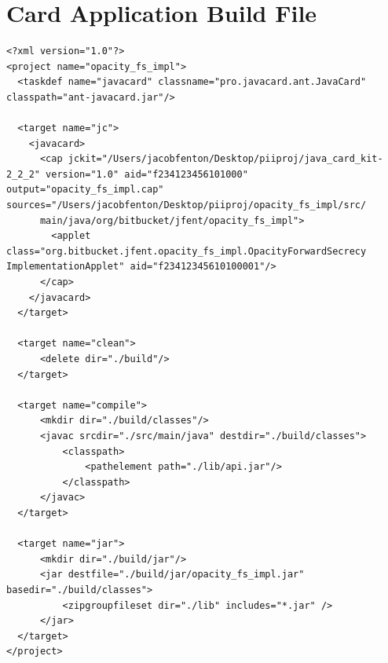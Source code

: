 \documentclass[12pt,a4paper,twoside,openright]{report}
\begin{document}


\chapter{Card Application Build File}
\label{appendix:cardappbuildfile}

\begin{verbatim}
<?xml version="1.0"?>
<project name="opacity_fs_impl">
  <taskdef name="javacard" classname="pro.javacard.ant.JavaCard" classpath="ant-javacard.jar"/>

  <target name="jc">
    <javacard>
      <cap jckit="/Users/jacobfenton/Desktop/piiproj/java_card_kit-2_2_2" version="1.0" aid="f234123456101000" output="opacity_fs_impl.cap" sources="/Users/jacobfenton/Desktop/piiproj/opacity_fs_impl/src/
      main/java/org/bitbucket/jfent/opacity_fs_impl">
        <applet class="org.bitbucket.jfent.opacity_fs_impl.OpacityForwardSecrecy ImplementationApplet" aid="f23412345610100001"/>
      </cap>
    </javacard>
  </target>

  <target name="clean">
      <delete dir="./build"/>
  </target>

  <target name="compile">
      <mkdir dir="./build/classes"/>
      <javac srcdir="./src/main/java" destdir="./build/classes">
          <classpath>
              <pathelement path="./lib/api.jar"/>
          </classpath>
      </javac>
  </target>

  <target name="jar">
      <mkdir dir="./build/jar"/>
      <jar destfile="./build/jar/opacity_fs_impl.jar" basedir="./build/classes">
          <zipgroupfileset dir="./lib" includes="*.jar" />
      </jar>
  </target>
</project>
\end{verbatim}
\end{document}
